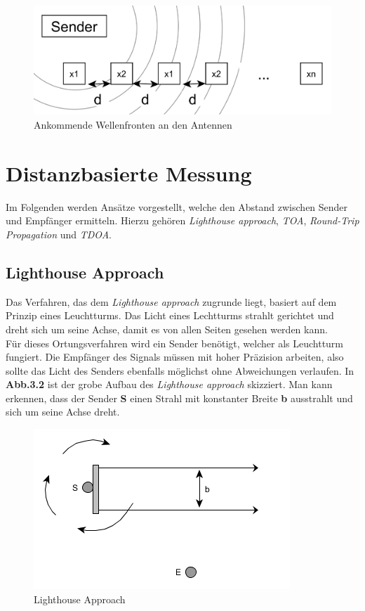 \documentclass[12pt, a4wide]{scrreprt}
\begin{document}
\begin{figure}[!htb]
\centering
\includegraphics[scale=.27]{phase_int2.png}
\caption{Ankommende Wellenfronten an den Antennen}
\end{figure}

\section{Distanzbasierte Messung}
Im Folgenden werden Ansätze vorgestellt, welche den Abstand zwischen Sender und Empfänger ermitteln. Hierzu gehören \textit{Lighthouse approach}, \textit{\ac{TOA}}, \textit{Round-Trip Propagation} und \textit{\ac{TDOA}}.
  \subsection{Lighthouse Approach}
Das Verfahren, das dem \textit{Lighthouse approach}\cite{lighthouse} zugrunde liegt, basiert auf dem Prinzip eines Leuchtturms. Das Licht eines Lechtturms strahlt gerichtet und dreht sich um seine Achse, damit es von allen Seiten gesehen werden kann.\\
\indent
Für dieses Ortungsverfahren wird ein Sender benötigt, welcher als Leuchtturm fungiert. Die Empfänger des Signals müssen mit hoher Präzision arbeiten, also sollte das Licht des Senders ebenfalls möglichst ohne Abweichungen verlaufen. In {\bf Abb.3.2} ist der grobe Aufbau des \textit{Lighthouse approach} skizziert. Man kann erkennen, dass der Sender {\bf S} einen Strahl mit konstanter Breite {\bf b} ausstrahlt und sich um seine Achse dreht.\\

\begin{figure}[!htb]
\centering
\includegraphics[scale=.68]{lighthouse.png}
\caption{Lighthouse Approach}
\end{figure}
\end{document}
